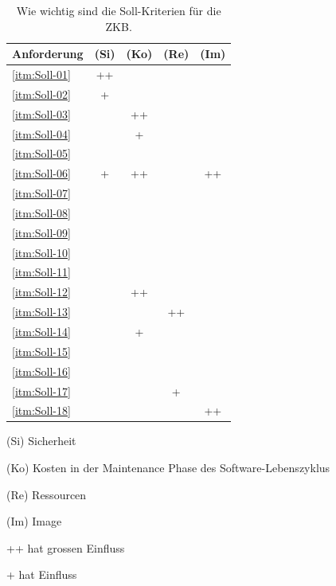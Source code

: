   \begin{table}[!h]
    \sffamily 
    \begin{center}
      \begin{threeparttable}
        \begin{tabular}{p{9cm}cccc}
          \toprule
          Anforderung & (Si) & (Ko) & (Re) & (Im)\\
          \midrule
          \ref{itm:Soll-01} & ++ &    &    &    \\
          \ref{itm:Soll-02} & +  &    &    &    \\
          \ref{itm:Soll-03} &    & ++ &    &    \\
          \ref{itm:Soll-04} &    & +  &    &    \\
          \ref{itm:Soll-05} &    &    &    &    \\
          \ref{itm:Soll-06} & +  & ++ &    & ++ \\
          \ref{itm:Soll-07} &    &    &    &    \\
          \ref{itm:Soll-08} &    &    &    &    \\
          \ref{itm:Soll-09} &    &    &    &    \\
          \ref{itm:Soll-10} &    &    &    &    \\
          \ref{itm:Soll-11} &    &    &    &    \\
          \ref{itm:Soll-12} &    & ++ &    &    \\
          \ref{itm:Soll-13} &    &    & ++ &    \\
          \ref{itm:Soll-14} &    & +  &    &    \\
          \ref{itm:Soll-15} &    &    &    &    \\
          \ref{itm:Soll-16} &    &    &    &    \\
          \ref{itm:Soll-17} &    &    & +  &    \\
          \ref{itm:Soll-18} &    &    &    & ++ \\
          \bottomrule
        \end{tabular}
        \caption{Wie wichtig sind die Soll-Kriterien für die ZKB.}
        \label{tab:kosolidierungDerSollKriterien}
        \medskip 
        \begin{tablenotes}[++]\footnotesize 
          \item[(Si)] Sicherheit 
          \item[(Ko)] Kosten in der Maintenance Phase des Software-Lebenszyklus
          \item[(Re)] Ressourcen 
          \item[(Im)] Image
          \item[++] hat grossen Einfluss
          \item[+] hat Einfluss
        \end{tablenotes} 
      \end{threeparttable}
    \end{center}
  \end{table}
  
